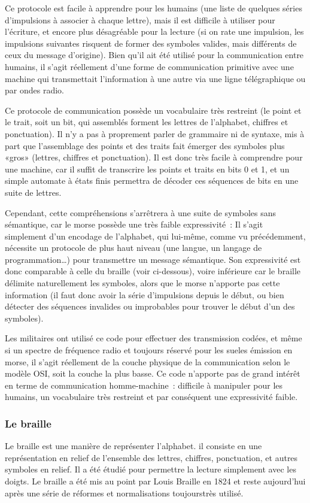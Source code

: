 \documentclass[french,a4paper]{article}
\begin{document}
Ce protocole est facile à apprendre pour les humains (une liste de quelques séries d'impulsions à associer à chaque lettre), mais il est
difficile à utiliser pour l'écriture, et encore plus désagréable pour la lecture (si on rate une impulsion, les impulsions suivantes
risquent de former des symboles valides, mais différents de ceux du message d'origine). Bien qu'il ait été utilisé pour la communication
entre humains, il s'agit réellement d'une forme de communication primitive avec une machine qui transmettait l'information à une autre via
une ligne télégraphique ou par ondes radio.

Ce protocole de communication possède un vocabulaire très restreint (le point et le trait, soit un bit, qui assemblés forment les lettres de
l'alphabet, chiffres et ponctuation). Il n'y a pas à proprement parler de grammaire ni de syntaxe, mis à part que l'assemblage des points et
des traits fait émerger des symboles plus «gros» (lettres, chiffres et ponctuation). Il est donc très facile à comprendre pour une machine,
car il suffit de transcrire les points et traits en bits 0 et 1, et un simple automate à états finis permettra de décoder ces séquences de
bits en une suite de lettres.

Cependant, cette compréhensions s'arrêtrera à une suite de symboles sans sémantique, car le morse possède une très faible expressivité~: Il
s'agit simplement d'un encodage de l'alphabet, qui lui-même, comme vu précédemment, nécessite un protocole de plus haut niveau (une langue,
un langage de programmation…) pour transmettre un message sémantique. Son expressivité est donc comparable à celle du braille (voir
ci-dessous), voire inférieure car le braille délimite naturellement les symboles, alors que le morse n'apporte pas cette information (il
faut donc avoir la série d'impulsions depuis le début, ou bien détecter des séquences invalides ou improbables pour trouver le début d'un
des symboles).

Les militaires ont utilisé ce code pour effectuer des transmission codées, et même si un spectre de fréquence radio et toujours réservé pour
les sueles émission en morse, il s'agit réellement de la couche physique de la communication selon le modèle OSI, soit la couche la plus
basse. Ce code n'apporte pas de grand intérêt en terme de communication homme-machine~: difficile à manipuler pour les humains, un
vocabulaire très restreint et par conséquent une expressivité faible.

\subsubsection{Le braille}
Le braille est une manière de représenter l'alphabet. il consiste en une représentation en relief de l'ensemble des lettres, chiffres,
ponctuation, et autres symboles en relief. Il a été étudié pour permettre la lecture simplement avec les doigts. Le braille a été mis au
point par Louis Braille en 1824 et reste aujourd'hui après une série de réformes et normalisations toujourstrès utilisé.
\end{document}
